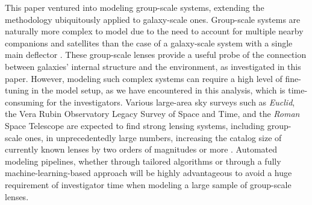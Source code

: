 \documentclass{aa}
\begin{document}
This paper ventured into modeling group-scale systems, extending the methodology ubiquitously applied to galaxy-scale ones. Group-scale systems are naturally more complex to model due to the need to account for multiple nearby companions and satellites than the case of a galaxy-scale system with a single main deflector \citep[with one or two small satellites for $\lesssim$30\% cases, e.g.,][]{Shajib19}. These group-scale lenses provide a useful probe of the connection between galaxies' internal structure and the environment, as investigated in this paper. However, modeling such complex systems can require a high level of fine-tuning in the model setup, as we have encountered in this analysis, which is time-consuming for the investigators. Various large-area sky surveys such as \textit{Euclid}, the Vera Rubin Observatory Legacy Survey of Space and Time, and the \textit{Roman} Space Telescope are expected to find strong lensing systems, including group-scale ones, in unprecedentedly large numbers, increasing the catalog size of currently known lenses by two orders of magnitudes or more \citep{Oguri10, Collett15, Shajib24b}. Automated modeling pipelines, whether through tailored algorithms \citep[e.g.,][]{Shajib19, Shajib21, bib3:Schmidt23} or through a fully machine-learning-based approach \citep[e.g.,][]{Erickson24} will be highly advantageous to avoid a huge requirement of investigator time when modeling a large sample of group-scale lenses.


\end{document}
